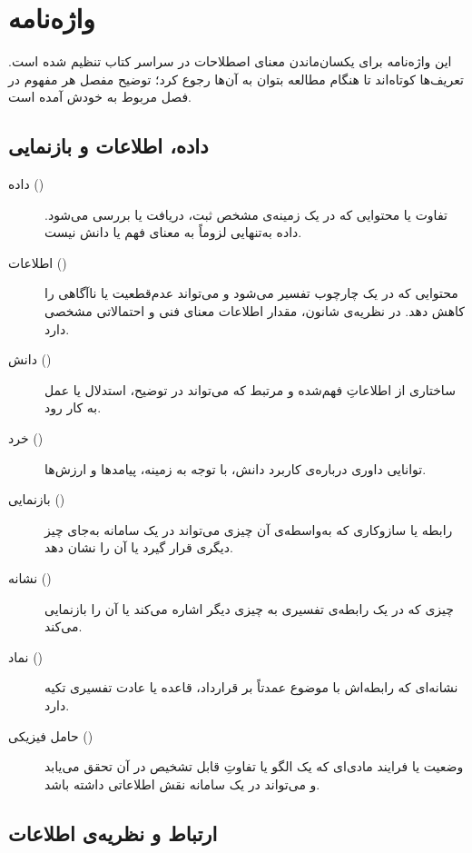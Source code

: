 \chapter*{واژه‌نامه}

این واژه‌نامه برای یکسان‌ماندن معنای اصطلاحات در سراسر کتاب تنظیم شده است. تعریف‌ها کوتاه‌اند تا هنگام مطالعه بتوان به آن‌ها رجوع کرد؛ توضیح مفصل هر مفهوم در فصل مربوط به خودش آمده است.

\section*{داده، اطلاعات و بازنمایی}

\begin{description}
  \item[داده ()] تفاوت یا محتوایی که در یک زمینه‌ی مشخص ثبت، دریافت یا بررسی می‌شود. داده به‌تنهایی لزوماً به معنای فهم یا دانش نیست.
  \item[اطلاعات ()] محتوایی که در یک چارچوب تفسیر می‌شود و می‌تواند عدم‌قطعیت یا ناآگاهی را کاهش دهد. در نظریه‌ی شانون، مقدار اطلاعات معنای فنی و احتمالاتی مشخصی دارد.
  \item[دانش ()] ساختاری از اطلاعاتِ فهم‌شده و مرتبط که می‌تواند در توضیح، استدلال یا عمل به کار رود.
  \item[خرد ()] توانایی داوری درباره‌ی کاربرد دانش، با توجه به زمینه، پیامدها و ارزش‌ها.
  \item[بازنمایی ()] رابطه یا سازوکاری که به‌واسطه‌ی آن چیزی می‌تواند در یک سامانه به‌جای چیز دیگری قرار گیرد یا آن را نشان دهد.
  \item[نشانه ()] چیزی که در یک رابطه‌ی تفسیری به چیزی دیگر اشاره می‌کند یا آن را بازنمایی می‌کند.
  \item[نماد ()] نشانه‌ای که رابطه‌اش با موضوع عمدتاً بر قرارداد، قاعده یا عادت تفسیری تکیه دارد.
  \item[حامل فیزیکی ()] وضعیت یا فرایند مادی‌ای که یک الگو یا تفاوتِ قابل تشخیص در آن تحقق می‌یابد و می‌تواند در یک سامانه نقش اطلاعاتی داشته باشد.
\end{description}

\section*{ارتباط و نظریه‌ی اطلاعات}

